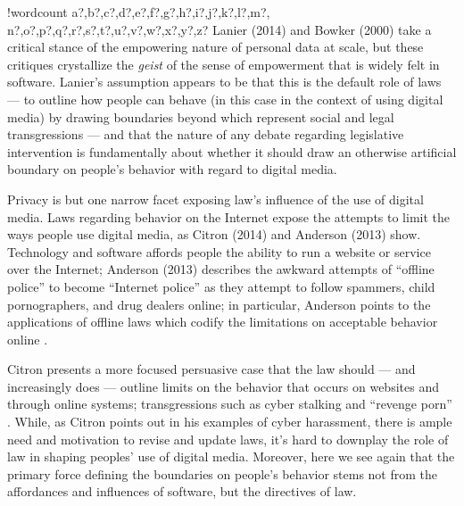 \documentclass[11pt]{article}
\newcounter{words}
\newenvironment{counted}{%
  \setcounter{words}{0}
  \SearchList!{wordcount}{\stepcounter{words}}
    {a?,b?,c?,d?,e?,f?,g?,h?,i?,j?,k?,l?,m?,
    n?,o?,p?,q?,r?,s?,t?,u?,v?,w?,x?,y?,z?}
  \UndoBoundary{'}
  \SearchOrder{p;}}{%
  \StopSearching}
\begin{document}
\begin{counted}
Lanier (2014) and Bowker (2000) take a critical stance of the empowering nature of personal data at scale,
but these critiques crystallize the \textit{geist}
of the sense of empowerment that is widely felt in software.
Lanier's assumption appears to be that this is the default role of laws
--- to outline how people can behave
(in this case in the context of using digital media)
by drawing boundaries beyond which represent social and legal transgressions ---
and that the nature of any debate regarding
legislative intervention is fundamentally about whether it should draw an otherwise
artificial boundary on people's behavior with regard to digital media.

Privacy is but one narrow facet exposing law's influence of the use of digital media.
Laws regarding behavior on the Internet expose the attempts to limit the ways people use digital media,
as Citron (2014) and Anderson (2013) show.
Technology and software affords people the ability to run a website or service over the Internet;
Anderson (2013) describes the awkward attempts of ``offline police'' to become ``Internet police''
as they attempt to follow spammers, child pornographers, and drug dealers online;
in particular,
Anderson points to the applications of offline laws
which codify the limitations on acceptable behavior online
\cite{anderson2013internet}.

Citron presents a more focused persuasive case that the law should %
--- and increasingly does ---
outline limits on the behavior that occurs on websites and through online systems;
transgressions such as cyber stalking and ``revenge porn'' \cite{citron2014hate}.
While, as Citron points out in his examples of cyber harassment,
there is ample need and motivation to revise and update laws,
it's hard to downplay the role of law in shaping peoples' use of digital media.
Moreover, here we see again that the primary force defining the boundaries on people's behavior
stems not from the affordances and influences of software, but the directives of law.


\end{counted}
\end{document}
